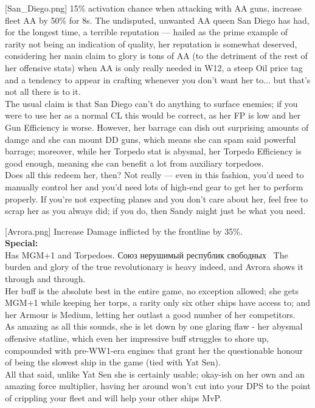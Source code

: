 [San_Diego.png]
{15\% activation chance when attacking with AA guns, increase fleet AA by 50\% for 8s. }
{The undisputed, unwanted AA queen}
{San Diego has had, for the longest time, a terrible reputation --- hailed as the prime example of rarity not being an indication of quality, her reputation is somewhat deserved, considering her main claim to glory is tons of AA (to the detriment of the rest of her offensive stats) when AA is only really needed in W12, a steep Oil price tag and a tendency to appear in crafting whenever you don't want her to... but that's not all there is to it.\\
The usual claim is that San Diego can't do anything to surface enemies; if you were to use her as a normal CL this would be correct, as her FP is low and her Gun Efficiency is worse. However, her barrage can dish out surprising amounts of damge and she can mount DD guns, which means she can spam said powerful barrage; moreover, while her Torpedo stat is abysmal, her Torpedo Efficiency is good enough, meaning she can benefit a lot from auxiliary torpedoes.\\
Does all this redeem her, then? Not really --- even in this fashion, you'd need to manually control her and you'd need lots of high-end gear to get her to perform properly. If you're not expecting planes and you don't care about her, feel free to scrap her as you always did; if you do, then Sandy might just be what you need.}

[Avrora.png]
{Increase Damage inflicted by the frontline by 35\%.\\
\textbf{Special:}\\ Has MGM+1 and Torpedoes.}
{\foreignlanguage{russian}{Союз нерушимый республик свободных}~} %
{The burden and glory of the true revolutionary is heavy indeed, and Avrora shows it through and through.\\
Her buff is the absolute best in the entire game, no exception allowed; she gets MGM+1 while keeping her torps, a rarity only six other ships have access to; and her Armour is Medium, letting her outlast a good number of her competitors.\\
As amazing as all this sounds, she is let down by one glaring flaw - her abysmal offensive statline, which even her impressive buff struggles to shore up, compounded with pre-WW1-era engines that grant her the questionable honour of being the slowest ship in the game (tied with Yat Sen).\\
All that said, unlike Yat Sen she is certainly usable; okay-ish on her own and an amazing force multiplier, having her around won't cut into your DPS to the point of crippling your fleet and will help your other ships MvP.}


